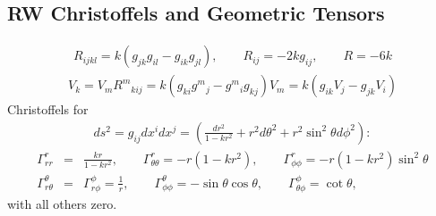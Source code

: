 \documentclass[10pt,letterpaper]{article}
\numberwithin{equation}{section}
\begin{document}
\begin{appendices}
\section{RW Christoffels and Geometric Tensors}
\begin{eqnarray}
R_{ijkl} = k(g_{jk}g_{il}-g_{ik}g_{jl}),\qquad R_{ij} = -2kg_{ij},\qquad R = -6k
\end{eqnarray}
\begin{eqnarray}
[\nabla_i,\nabla_j]V_k = V_m R^m{}_{kij}= k (g_{ki}g^{m}{}_j - g^m{}_{i}g_{kj})V_m = k(g_{ik}V_j - g_{jk}V_i)
\label{covcom}
\end{eqnarray}
Christoffels for 
\begin{eqnarray}
ds^2 = g_{ij}dx^idx^j = \left( \frac{dr^2}{1-kr^2} + r^2 d\theta^2 + r^2\sin^2\theta d\phi^2\right):
\end{eqnarray}
\begin{eqnarray}
\Gamma^r_{rr} &=& \frac{kr}{1-kr^2},\qquad \Gamma^r_{\theta\theta} = -r(1-kr^2),\qquad \Gamma^r_{\phi\phi} = -r(1-kr^2)\sin^2\theta
\nonumber\\
\Gamma^\theta_{r\theta} &=& \Gamma^{\phi}_{r\phi} = \frac{1}{r},\qquad \Gamma^{\theta}_{\phi\phi} = -\sin\theta\cos\theta, \qquad \Gamma^{\phi}_{\theta\phi} = \cot\theta,
\end{eqnarray}
with all others zero. 
\end{appendices}
\end{document}
